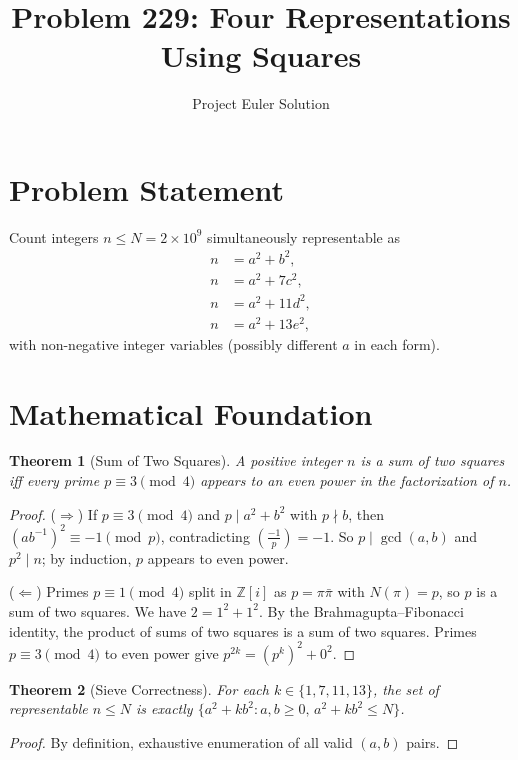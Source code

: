 \documentclass[12pt]{article}
\title{Problem 229: Four Representations Using Squares}
\author{Project Euler Solution}
\date{}
\newtheorem{theorem}{Theorem}
\begin{document}
\maketitle

\section{Problem Statement}
Count integers $n \leq N = 2 \times 10^9$ simultaneously representable as
\begin{align*}
n &= a^2 + b^2, \\
n &= a^2 + 7c^2, \\
n &= a^2 + 11d^2, \\
n &= a^2 + 13e^2,
\end{align*}
with non-negative integer variables (possibly different $a$ in each form).

\section{Mathematical Foundation}

\begin{theorem}[Sum of Two Squares]
A positive integer $n$ is a sum of two squares iff every prime $p \equiv 3 \pmod{4}$ appears to an even power in the factorization of $n$.
\end{theorem}
\begin{proof}
($\Rightarrow$) If $p \equiv 3 \pmod{4}$ and $p \mid a^2 + b^2$ with $p \nmid b$, then $(ab^{-1})^2 \equiv -1 \pmod{p}$, contradicting $\left(\frac{-1}{p}\right) = -1$. So $p \mid \gcd(a,b)$ and $p^2 \mid n$; by induction, $p$ appears to even power.

($\Leftarrow$) Primes $p \equiv 1 \pmod{4}$ split in $\mathbb{Z}[i]$ as $p = \pi\bar{\pi}$ with $N(\pi) = p$, so $p$ is a sum of two squares. We have $2 = 1^2 + 1^2$. By the Brahmagupta--Fibonacci identity, the product of sums of two squares is a sum of two squares. Primes $p \equiv 3 \pmod{4}$ to even power give $p^{2k} = (p^k)^2 + 0^2$.
\end{proof}

\begin{theorem}[Sieve Correctness]
For each $k \in \{1, 7, 11, 13\}$, the set of representable $n \leq N$ is exactly $\{a^2 + kb^2 : a, b \geq 0,\, a^2 + kb^2 \leq N\}$.
\end{theorem}
\begin{proof}
By definition, exhaustive enumeration of all valid $(a,b)$ pairs.
\end{proof}
\end{document}
